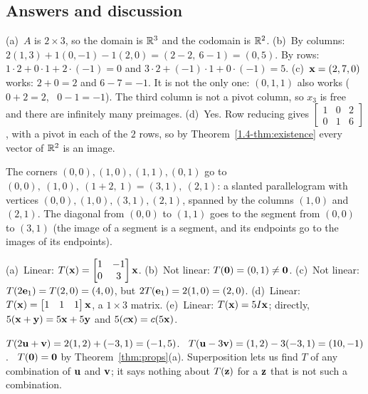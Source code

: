 \documentclass[11pt]{article}
\begin{document}
\subsection*{Answers and discussion}
\begin{description}[leftmargin=0pt,itemsep=5pt]
  \item[Knowledge Check \ref{kc:images}.] (a)~$A$ is $2\times3$, so the domain is $\mathbb{R}^3$ and the codomain is $\mathbb{R}^2$. (b)~By columns: $2(1,3)+1(0,-1)-1(2,0)=(2-2,\ 6-1)=(0,5)$. By rows: $1\cdot2+0\cdot1+2\cdot(-1)=0$ and $3\cdot2+(-1)\cdot1+0\cdot(-1)=5$. (c)~$\mathbf{x}=(2,7,0)$ works: $2+0=2$ and $6-7=-1$. It is not the only one: $(0,1,1)$ also works ($0+2=2$, \ $0-1=-1$). The third column is not a pivot column, so $x_3$ is free and there are infinitely many preimages. (d)~Yes. Row reducing gives $\begin{bmatrix}1&0&2\\0&1&6\end{bmatrix}$, with a pivot in each of the $2$ rows, so by Theorem~\ref{1.4-thm:existence} every vector of $\mathbb{R}^2$ is an image.
  \item[Knowledge Check \ref{kc:square}.] The corners $(0,0),(1,0),(1,1),(0,1)$ go to $(0,0),\ (1,0),\ (1+2,\ 1)=(3,1),\ (2,1)$: a slanted parallelogram with vertices $(0,0),(1,0),(3,1),(2,1)$, spanned by the columns $(1,0)$ and $(2,1)$. The diagonal from $(0,0)$ to $(1,1)$ goes to the segment from $(0,0)$ to $(3,1)$ (the image of a segment is a segment, and its endpoints go to the images of its endpoints).
  \item[Knowledge Check \ref{kc:linearornot}.] (a)~Linear: $T(\mathbf{x})=\begin{bmatrix}1&-1\\0&3\end{bmatrix}\mathbf{x}$. (b)~Not linear: $T(\mathbf{0})=(0,1)\neq\mathbf{0}$. (c)~Not linear: $T(2\mathbf{e}_1)=T(2,0)=(4,0)$, but $2T(\mathbf{e}_1)=2(1,0)=(2,0)$. (d)~Linear: $T(\mathbf{x})=\begin{bmatrix}1&1&1\end{bmatrix}\mathbf{x}$, a $1\times3$ matrix. (e)~Linear: $T(\mathbf{x})=5I\mathbf{x}$; directly, $5(\mathbf{x}+\mathbf{y})=5\mathbf{x}+5\mathbf{y}$ and $5(c\mathbf{x})=c(5\mathbf{x})$.
  \item[Knowledge Check \ref{kc:superpos}.] $T(2\mathbf{u}+\mathbf{v})=2(1,2)+(-3,1)=(-1,5)$. \ $T(\mathbf{u}-3\mathbf{v})=(1,2)-3(-3,1)=(10,-1)$. \ $T(\mathbf{0})=\mathbf{0}$ by Theorem~\ref{thm:props}(a). Superposition lets us find $T$ of any combination of $\mathbf{u}$ and $\mathbf{v}$; it says nothing about $T(\mathbf{z})$ for a $\mathbf{z}$ that is not such a combination.

\end{description}
\end{document}
